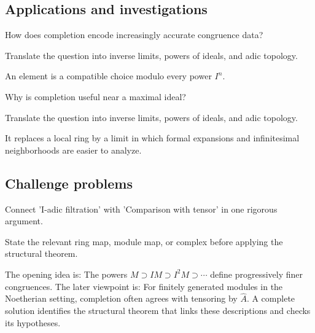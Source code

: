 \subsection*{Applications and investigations}

\begin{exercise}[Approximation]\label{exr:v18-expand-13}
How does completion encode increasingly accurate congruence data?
\end{exercise}
\begin{hint}
Translate the question into inverse limits, powers of ideals, and adic topology.
\end{hint}
\begin{solution}
An element is a compatible choice modulo every power $I^n$.
\end{solution}

\begin{exercise}\label{exr:v18-expand-14}
Why is completion useful near a maximal ideal?
\end{exercise}
\begin{hint}
Translate the question into inverse limits, powers of ideals, and adic topology.
\end{hint}
\begin{solution}
It replaces a local ring by a limit in which formal expansions and infinitesimal neighborhoods are easier to analyze.
\end{solution}

\subsection*{Challenge problems}

\begin{exercise}\label{exr:v18-expand-15}
Connect 'I-adic filtration' with 'Comparison with tensor' in one rigorous argument.
\end{exercise}
\begin{hint}
State the relevant ring map, module map, or complex before applying the structural theorem.
\end{hint}
\begin{solution}
The opening idea is: The powers $M\supset IM\supset I^2M\supset\cdots$ define progressively finer congruences. The later viewpoint is: For finitely generated modules in the Noetherian setting, completion often agrees with tensoring by $\widehat A$. A complete solution identifies the structural theorem that links these descriptions and checks its hypotheses.
\end{solution}

